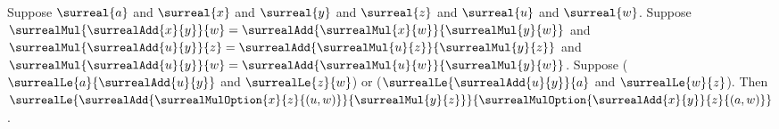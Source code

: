 \begin{lemma}\label{surreal_distributive_option_le_mixed}
    Suppose $\surreal{a}$ and $\surreal{x}$ and $\surreal{y}$ and
        $\surreal{z}$ and $\surreal{u}$ and $\surreal{w}$.
    Suppose
        $\surrealMul{\surrealAdd{x}{y}}{w}
            =\surrealAdd{\surrealMul{x}{w}}{\surrealMul{y}{w}}$ and
        $\surrealMul{\surrealAdd{u}{y}}{z}
            =\surrealAdd{\surrealMul{u}{z}}{\surrealMul{y}{z}}$ and
        $\surrealMul{\surrealAdd{u}{y}}{w}
            =\surrealAdd{\surrealMul{u}{w}}{\surrealMul{y}{w}}$.
    Suppose
        ($\surrealLe{a}{\surrealAdd{u}{y}}$ and
            $\surrealLe{z}{w}$) or
        ($\surrealLe{\surrealAdd{u}{y}}{a}$ and
            $\surrealLe{w}{z}$).
    Then
        $\surrealLe
            {\surrealAdd{\surrealMulOption{x}{z}{(u,w)}}
                {\surrealMul{y}{z}}}
            {\surrealMulOption{\surrealAdd{x}{y}}{z}{(a,w)}}$.
\end{lemma}
